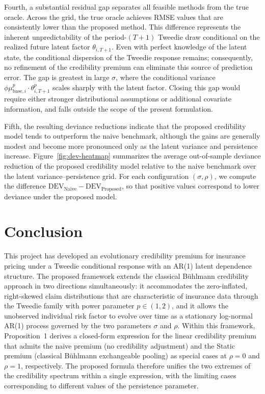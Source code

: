 \documentclass{sfuthesis}
\numberwithin{equation}{chapter}
\begin{document}
Fourth, a substantial residual gap separates all feasible methods
from the true oracle. Across the grid, the true oracle achieves
RMSE values that are consistently lower than the proposed
method. This difference represents the inherent unpredictability of the
period-$(T+1)$ Tweedie draw conditional on the realized future latent factor
$\theta_{i,T+1}$. Even with perfect knowledge of the latent state, the
conditional dispersion of the Tweedie response remains; consequently, no
refinement of the credibility premium can eliminate this source of prediction
error. The gap is greatest
in large $\sigma$, where the conditional variance
$\phi \mu_{\text{base}, i}^p \cdot \theta_{i, T+1}^{p}$ scales sharply with the
latent factor. Closing this gap would require either stronger
distributional assumptions or additional covariate information, and
falls outside the scope of the present formulation.


Fifth, the resulting deviance reductions indicate that the proposed credibility model tends to outperform the naive benchmark, although the gains are generally modest and become more pronounced only as the latent variance and persistence increase. Figure~\ref{fig:dev-heatmap} summarizes the average out-of-sample deviance reduction of the proposed credibility model relative to the naive benchmark over the latent variance–persistence grid. For each configuration \((\sigma, \rho)\), we compute the difference \(\mathrm{DEV}_{\mathrm{Naive}} - \mathrm{DEV}_{\mathrm{Proposed}}\), so that positive values correspond to lower deviance under the proposed model.



\pagebreak 
\chapter{Conclusion}
\label{sec:conclusion}

This project has developed an evolutionary credibility premium for
insurance pricing under a Tweedie conditional response with an AR(1)
latent dependence structure. The proposed framework extends the
classical Bühlmann credibility approach in two directions
simultaneously: it accommodates the zero-inflated, right-skewed claim
distributions that are characteristic of insurance data through the
Tweedie family with power parameter $p \in (1, 2)$, and it allows the
unobserved individual risk factor to evolve over time as a stationary
log-normal AR(1) process governed by the two parameters $\sigma$ and
$\rho$. Within this framework, Proposition~1 derives a closed-form
expression for the linear credibility premium that admits the naive
premium (no credibility adjustment) and the Static premium (classical
Bühlmann exchangeable pooling) as special cases at $\rho = 0$ and
$\rho = 1$, respectively. The proposed formula therefore unifies the two extremes of the credibility spectrum within a single expression, with the limiting cases corresponding to
different values of the persistence parameter.
\end{document}
